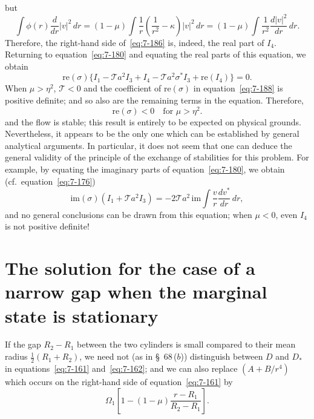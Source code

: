 but
\begin{equation}
\label{eq:7-187}
\int \phi(r)\frac{d}{dr}|v|^2\,dr
= (1-\mu)\int \frac{1}{r}\!\left(\frac{1}{r^2}-\kappa\right)|v|^2\,dr
= (1-\mu)\int \frac{1}{r^2}\frac{d|v|^2}{dr}\,dr.
\end{equation}
Therefore, the right-hand side of~\eqref{eq:7-186} is, indeed, the real part of $I_4$.
Returning to equation~\eqref{eq:7-180} and equating the real parts of this
equation, we obtain
\begin{equation}
\label{eq:7-188}
\mathrm{re}(\sigma)\{I_1-\mathscr{T}a^2 I_3+I_4-\mathscr{T}a^2 \sigma^* I_3 + \mathrm{re}(I_4)\} = 0.
\end{equation}
When $\mu > \eta^2$, $\mathscr{T} < 0$ and the coefficient of $\mathrm{re}(\sigma)$ in equation~\eqref{eq:7-188} is
positive definite; and so also are the remaining terms in the equation.
Therefore,
\begin{equation}
\label{eq:7-189}
\mathrm{re}(\sigma) < 0 \quad \text{for } \mu > \eta^2.
\end{equation}
and the flow is stable; this result is entirely to be expected on physical
grounds.  Nevertheless, it appears to be the only one which can be
established by general analytical arguments.  In particular, it does not
seem that one can deduce the general validity of the principle of the
exchange of stabilities for this problem.  For example, by equating the
imaginary parts of equation~\eqref{eq:7-180}, we obtain (cf.\ equation~\eqref{eq:7-176})
\begin{equation}
\label{eq:7-190}
\mathrm{im}(\sigma)(I_1+\mathscr{T}a^2 I_3)
= -2\mathscr{T}a^2\,\mathrm{im}\int\frac{v}{r}\frac{dv^*}{dr}\,dr,
\end{equation}
and no general conclusions can be drawn from this equation; when $\mu < 0$,
even $I_4$ is not positive definite!

\section{The solution for the case of a narrow gap when the marginal
state is stationary}\label{sec:7-71}
If the gap $R_2-R_1$ between the two cylinders is small compared to
their mean radius $\frac{1}{2}(R_1+R_2)$, we need not (as in \S~68\,($b$)) distinguish
between $D$ and $D_*$ in equations~\eqref{eq:7-161} and~\eqref{eq:7-162}; and we can also replace
$(A+B/r^4)$ which occurs on the right-hand side of equation~\eqref{eq:7-161} by
\begin{equation}
\label{eq:7-191}
\Omega_1\!\left[1-(1-\mu)\frac{r-R_1}{R_2-R_1}\right].
\end{equation}

